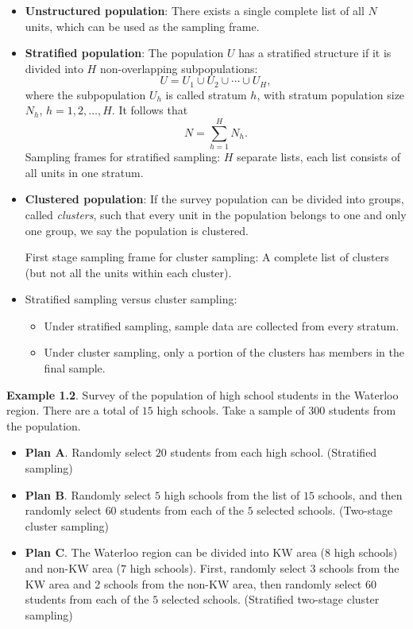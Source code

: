 \documentclass[oneside]{book}\usepackage[]{graphicx}\usepackage[svgnames]{xcolor}
\begin{document}
\begin{itemize}
      \item \textbf{Unstructured population}:
            There exists a single complete list of all $N$ units, which can be
            used as the sampling frame.
      \item \textbf{Stratified population}:
            The population $U$ has a stratified structure if it is divided into $H$
            non-overlapping subpopulations:
            \[ U=U_1\cup U_2\cup\cdots\cup U_H, \]
            where the subpopulation $ U_h $ is called stratum $ h $, with stratum
            population size $ N_h $, $ h=1,2,\ldots,H $. It follows that
            \[ N=\sum_{h=1}^{H}N_h. \]
            Sampling frames for stratified sampling:
            $H$ separate lists, each list consists of all units in one stratum.
      \item \textbf{Clustered population}:
            If the survey population can be divided into groups, called
            \emph{clusters}, such that every unit in the population belongs to one
            and only one group, we say the population is clustered.

            First stage sampling frame for cluster sampling: A complete list of clusters (but not all the units within each
            cluster).
      \item Stratified sampling versus cluster sampling:
            \begin{itemize}
                  \item Under stratified sampling, sample data are collected from every
                        stratum.
                  \item Under cluster sampling, only a portion of the clusters has
                        members in the final sample.
            \end{itemize}
\end{itemize}
\begin{Example}{}
      \textbf{Example 1.2}. Survey of the population of high school students in the
      Waterloo region. There are a total of $15$ high schools. Take a sample
      of $300$ students from the population.
      \begin{itemize}
            \item \textbf{Plan A}. Randomly select $20$ students from each high school.
                  (Stratified sampling)
            \item \textbf{Plan B}. Randomly select $5$ high schools from the list of $15$ schools,
                  and then randomly select $60$ students from each of the $5$ selected
                  schools. (Two-stage cluster sampling)
            \item \textbf{Plan C}. The Waterloo region can be divided into KW area ($8$ high
                  schools) and non-KW area ($7$ high schools). First, randomly select $3$
                  schools from the KW area and 2 schools from the non-KW area, then
                  randomly select $60$ students from each of the $5$ selected schools.
                  (Stratified two-stage cluster sampling)
      \end{itemize}
\end{Example}
\end{document}

